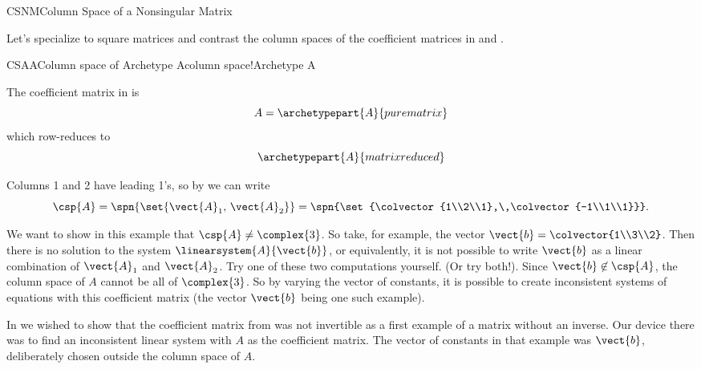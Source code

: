 \begin{subsect}{CSNM}{Column Space of a Nonsingular Matrix}
%
\begin{para}Let's specialize to square matrices and contrast the column spaces of the coefficient matrices in  and .\end{para}
%
\begin{example}{CSAA}{Column space of Archetype A}{column space!Archetype A}
%
\begin{para}The coefficient matrix in  is
%
\begin{equation*}
A=\archetypepart{A}{purematrix}\end{equation*}
%
which row-reduces to
%
\begin{equation*}
\archetypepart{A}{matrixreduced}\end{equation*}\end{para}
%
\begin{para}Columns 1 and 2 have leading 1's, so by  we can write
%
\begin{equation*}
\csp{A}=\spn{\set{\vect{A}_1,\,\vect{A}_2}}=\spn{\set{\colvector{1\\2\\1},\,\colvector{-1\\1\\1}}}.
\end{equation*}
\end{para}
%
\begin{para}We want to show in this example that $\csp{A}\neq\complex{3}$.  So take, for example, the vector $\vect{b}=\colvector{1\\3\\2}$.  Then there is no solution to the system $\linearsystem{A}{\vect{b}}$, or equivalently, it is not possible to write $\vect{b}$ as a linear combination of $\vect{A}_1$ and $\vect{A}_2$.  Try  one of these two computations yourself.  (Or try both!).  Since $\vect{b}\not\in\csp{A}$, the column space of $A$ cannot be all of $\complex{3}$.  So by varying the vector of constants, it is possible to create inconsistent systems of equations with this coefficient matrix (the vector $\vect{b}$ being one such example).\end{para}
%
\begin{para}In  we wished to show that the coefficient matrix from  was not invertible as a first example of a matrix without an inverse.  Our device there was to find an inconsistent linear system with $A$ as the coefficient matrix.  The vector of constants in that example was $\vect{b}$, deliberately chosen outside the column space of $A$.\end{para}

\end{example}
\end{subsect}
